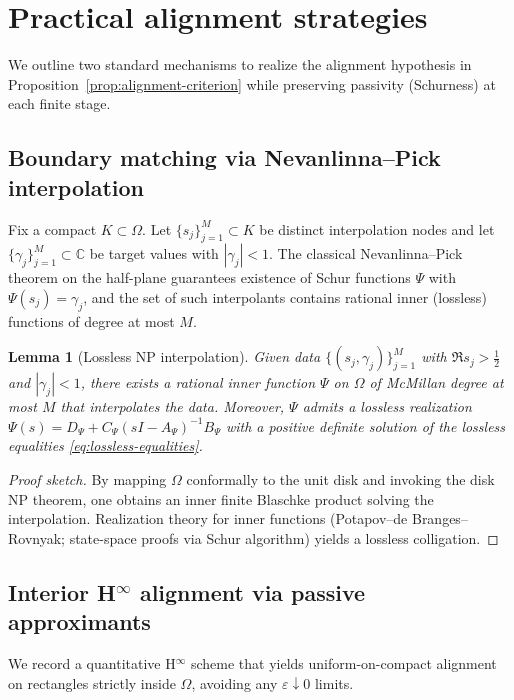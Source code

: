\documentclass[11pt]{article}
\newtheorem{lemma}[theorem]{Lemma}
\theoremstyle{remark}
\newcommand{\C}{\mathbb{C}}
\begin{document}
\section{Practical alignment strategies}\label{sec:practical-alignment}
We outline two standard mechanisms to realize the alignment hypothesis in Proposition~\ref{prop:alignment-criterion} while preserving passivity (Schurness) at each finite stage.

\subsection{Boundary matching via Nevanlinna--Pick interpolation}
Fix a compact \(K\subset\Omega\). Let \(\{s_j\}_{j=1}^{M}\subset K\) be distinct interpolation nodes and let \(\{\gamma_j\}_{j=1}^{M}\subset\C\) be target values with \(|\gamma_j|<1\). The classical Nevanlinna--Pick theorem on the half-plane guarantees existence of Schur functions \(\Psi\) with \(\Psi(s_j)=\gamma_j\), and the set of such interpolants contains rational inner (lossless) functions of degree at most \(M\).

\begin{lemma}[Lossless NP interpolation]\label{lem:NP-lossless}
Given data \(\{(s_j,\gamma_j)\}_{j=1}^{M}\) with \(\Re s_j>\tfrac12\) and \(|\gamma_j|<1\), there exists a rational inner function \(\Psi\) on \(\Omega\) of McMillan degree at most \(M\) that interpolates the data. Moreover, \(\Psi\) admits a lossless realization \(\Psi(s)=D_\Psi+C_\Psi(sI-A_\Psi)^{-1}B_\Psi\) with a positive definite solution of the lossless equalities \eqref{eq:lossless-equalities}.
\end{lemma}
\begin{proof}[Proof sketch]
By mapping \(\Omega\) conformally to the unit disk and invoking the disk NP theorem, one obtains an inner finite Blaschke product solving the interpolation. Realization theory for inner functions (Potapov--de Branges--Rovnyak; state-space proofs via Schur algorithm) yields a lossless colligation.
\end{proof}

\subsection{Interior H$^\infty$ alignment via passive approximants}\label{subsec:hinf-passive}
We record a quantitative H$^\infty$ scheme that yields uniform-on-compact alignment on rectangles strictly inside $\Omega$, avoiding any $\varepsilon\downarrow 0$ limits.
\end{document}
